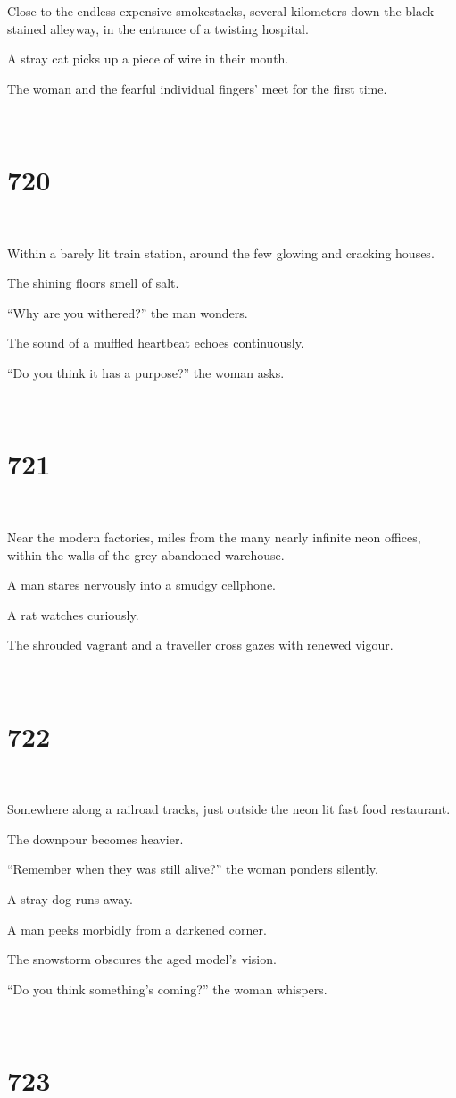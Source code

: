 \documentclass{report}
\begin{document}
Close to the endless expensive smokestacks, several kilometers down the black stained alleyway, in the entrance of a twisting hospital.

A stray cat picks up a piece of wire in their mouth.

The woman and the fearful individual fingers' meet for the first time.

~
\chapter*{720}
~

Within a barely lit train station, around the few glowing and cracking houses.

The shining floors smell of salt.

``Why are you withered?'' the man wonders.

The sound of a muffled heartbeat echoes continuously.

``Do you think it has a purpose?'' the woman asks.

~
\chapter*{721}
~

Near the modern factories, miles from the many nearly infinite neon offices, within the walls of the grey abandoned warehouse.

A man stares nervously into a smudgy cellphone.

A rat watches curiously.

The shrouded vagrant and a traveller cross gazes with renewed vigour.

~
\chapter*{722}
~

Somewhere along a railroad tracks, just outside the neon lit fast food restaurant.

The downpour becomes heavier.

``Remember when they was still alive?'' the woman ponders silently.

A stray dog runs away.

A man peeks morbidly from a darkened corner.

The snowstorm obscures the aged model's vision.

``Do you think something's coming?'' the woman whispers.

~
\chapter*{723}
~
\end{document}
